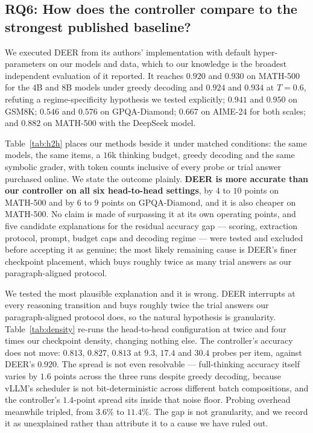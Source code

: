 \documentclass[acmsmall]{acmart}
\theoremstyle{acmdefinition}%
\theoremstyle{acmplain}}{}%
\begin{document}
\subsection{RQ6: How does the controller compare to the strongest published baseline?}\label{sec:rq6}
We executed DEER from its authors' implementation with default hyper-parameters on our models and data, which to our knowledge is the broadest independent evaluation of it reported. It reaches $0.920$ and $0.930$ on MATH-500 for the 4B and 8B models under greedy decoding and $0.924$ and $0.934$ at $T=0.6$, refuting a regime-specificity hypothesis we tested explicitly; $0.941$ and $0.950$ on GSM8K; $0.546$ and $0.576$ on GPQA-Diamond; $0.667$ on AIME-24 for both scales; and $0.882$ on MATH-500 with the DeepSeek model.

Table~\ref{tab:h2h} places our methods beside it under matched conditions: the same models, the same items, a $16$k thinking budget, greedy decoding and the same symbolic grader, with token counts inclusive of every probe or trial answer purchased online. We state the outcome plainly. \textbf{DEER is more accurate than our controller on all six head-to-head settings}, by $4$ to $10$ points on MATH-500 and by $6$ to $9$ points on GPQA-Diamond, and it is also cheaper on MATH-500. No claim is made of surpassing it at its own operating points, and five candidate explanations for the residual accuracy gap --- scoring, extraction protocol, prompt, budget caps and decoding regime --- were tested and excluded before accepting it as genuine; the most likely remaining cause is DEER's finer checkpoint placement, which buys roughly twice as many trial answers as our paragraph-aligned protocol.

We tested the most plausible explanation and it is wrong. DEER interrupts at every reasoning transition and buys roughly twice the trial answers our paragraph-aligned protocol does, so the natural hypothesis is granularity. Table~\ref{tab:density} re-runs the head-to-head configuration at twice and four times our checkpoint density, changing nothing else. The controller's accuracy does not move: $0.813$, $0.827$, $0.813$ at $9.3$, $17.4$ and $30.4$ probes per item, against DEER's $0.920$. The spread is not even resolvable --- full-thinking accuracy itself varies by $1.6$ points across the three runs despite greedy decoding, because vLLM's scheduler is not bit-deterministic across different batch compositions, and the controller's $1.4$-point spread sits inside that noise floor. Probing overhead meanwhile tripled, from $3.6\%$ to $11.4\%$. The gap is not granularity, and we record it as unexplained rather than attribute it to a cause we have ruled out.
\end{document}

